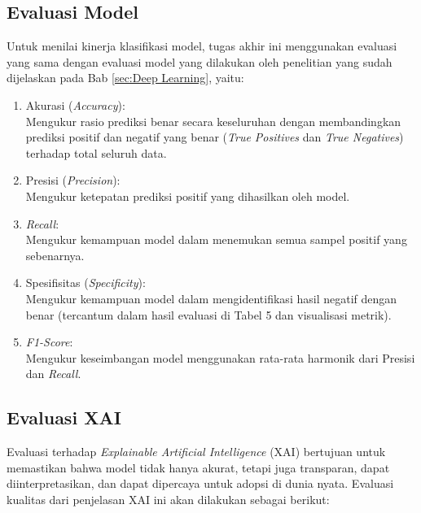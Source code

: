 \subsection{Evaluasi Model}
Untuk menilai kinerja klasifikasi model, tugas akhir ini menggunakan evaluasi yang sama dengan evaluasi model yang dilakukan oleh penelitian yang sudah dijelaskan pada Bab \ref{sec:Deep Learning}, yaitu:

\begin{enumerate}
	\item Akurasi (\textit{Accuracy}): \\
	Mengukur rasio prediksi benar secara keseluruhan dengan membandingkan prediksi positif dan negatif yang benar (\textit{True Positives} dan \textit{True Negatives}) terhadap total seluruh data.
	\item Presisi (\textit{Precision}): \\
	Mengukur ketepatan prediksi positif yang dihasilkan oleh model.
	\item \textit{Recall}: \\
	Mengukur kemampuan model dalam menemukan semua sampel positif yang sebenarnya.
	\item Spesifisitas (\textit{Specificity}): \\
	Mengukur kemampuan model dalam mengidentifikasi hasil negatif dengan benar (tercantum dalam hasil evaluasi di Tabel 5 dan visualisasi metrik).
	\item \textit{F1-Score}: \\
	Mengukur keseimbangan model menggunakan rata-rata harmonik dari Presisi dan \textit{Recall}.
\end{enumerate}

\subsection{Evaluasi XAI}
Evaluasi terhadap \textit{Explainable Artificial Intelligence} (XAI) bertujuan untuk memastikan bahwa model tidak hanya akurat, tetapi juga transparan, dapat diinterpretasikan, dan dapat dipercaya untuk adopsi di dunia nyata. Evaluasi kualitas dari penjelasan XAI ini akan dilakukan sebagai berikut:


